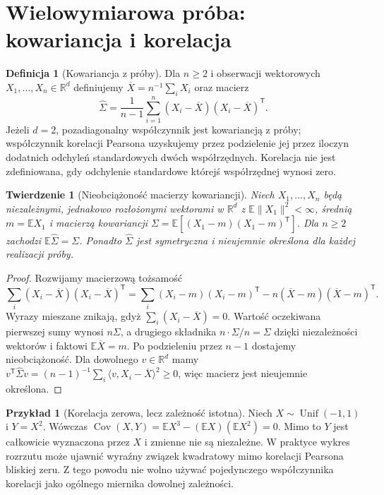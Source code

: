 \documentclass[11pt,a4paper,oneside]{report}
\numberwithin{equation}{chapter}
\theoremstyle{plain}
\newtheorem{twierdzenie}{Twierdzenie}[chapter]
\theoremstyle{definition}
\newtheorem{definicja}{Definicja}[chapter]
\newtheorem{przyklad}{Przykład}[chapter]
\theoremstyle{remark}
\newcommand{\R}{\mathbb R}
\newcommand{\E}{\mathbb E}
\newcommand{\Cov}{\operatorname{Cov}}
\newcommand{\norm}[1]{\lVert#1\rVert}
\begin{document}
\section{Wielowymiarowa próba: kowariancja i korelacja}\label{sec:sample-covariance}
\begin{definicja}[Kowariancja z próby]\label{def:samplecov}
Dla $n\ge2$ i obserwacji wektorowych $X_1,\ldots,X_n\in\R^d$ definiujemy $\overline X=n^{-1}\sum_iX_i$ oraz macierz
\[
\widehat\Sigma=\frac1{n-1}\sum_{i=1}^n(X_i-\overline X)(X_i-\overline X)^{\mathsf T}.
\]
Jeżeli $d=2$, pozadiagonalny współczynnik jest kowariancją z próby; współczynnik korelacji Pearsona uzyskujemy przez podzielenie jej przez iloczyn dodatnich odchyleń standardowych dwóch współrzędnych. Korelacja nie jest zdefiniowana, gdy odchylenie standardowe którejś współrzędnej wynosi zero.
\end{definicja}

\begin{twierdzenie}[Nieobciążoność macierzy kowariancji]\label{thm:samplecov-unbiased}
Niech $X_1,\ldots,X_n$ będą niezależnymi, jednakowo rozłożonymi wektorami w $\R^d$ z $\E\norm{X_1}^2<\infty$, średnią $m=\E X_1$ i macierzą kowariancji $\Sigma=\E[(X_1-m)(X_1-m)^{\mathsf T}]$. Dla $n\ge2$ zachodzi $\E\widehat\Sigma=\Sigma$. Ponadto $\widehat\Sigma$ jest symetryczna i nieujemnie określona dla każdej realizacji próby.
\end{twierdzenie}
\begin{proof}
Rozwijamy macierzową tożsamość
\[
\sum_i(X_i-\overline X)(X_i-\overline X)^{\mathsf T}
=\sum_i(X_i-m)(X_i-m)^{\mathsf T}
-n(\overline X-m)(\overline X-m)^{\mathsf T}.
\]
Wyrazy mieszane znikają, gdyż $\sum_i(X_i-\overline X)=0$. Wartość oczekiwana pierwszej sumy wynosi $n\Sigma$, a drugiego składnika $n\cdot\Sigma/n=\Sigma$ dzięki niezależności wektorów i faktowi $\E\overline X=m$. Po podzieleniu przez $n-1$ dostajemy nieobciążoność. Dla dowolnego $v\in\R^d$ mamy $v^{\mathsf T}\widehat\Sigma v=(n-1)^{-1}\sum_i\langle v,X_i-\overline X\rangle^2\ge0$, więc macierz jest nieujemnie określona.
\end{proof}

\begin{przyklad}[Korelacja zerowa, lecz zależność istotna]
Niech $X\sim\operatorname{Unif}(-1,1)$ i $Y=X^2$. Wówczas $\Cov(X,Y)=\E X^3-(\E X)(\E X^2)=0$. Mimo to $Y$ jest całkowicie wyznaczona przez $X$ i zmienne nie są niezależne. W praktyce wykres rozrzutu może ujawnić wyraźny związek kwadratowy mimo korelacji Pearsona bliskiej zeru. Z tego powodu nie wolno używać pojedynczego współczynnika korelacji jako ogólnego miernika dowolnej zależności.
\end{przyklad}
\end{document}
